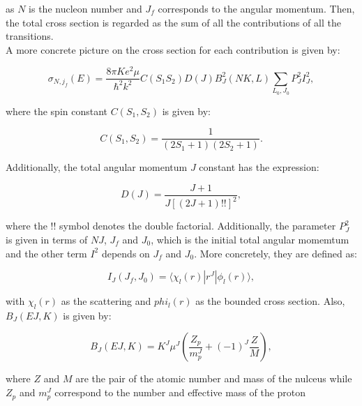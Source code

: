 \documentclass[openany]{book}
\begin{document}
as $N$ is the nucleon number and $J_f$ corresponds to the angular momentum. Then, the total cross section is regarded as the sum of all the contributions of all the transitions.\\

A more concrete picture on the cross section for each contribution is given by: 

\begin{equation}\label{eq:potential_radiativeCrossSections_each}
	 \sigma_{N, j_f} (E) = \frac{8\pi K e^2 \mu}{\hbar^2 k^2} C(S_1 S_2) D(J) B^2_J(NK, L) \sum_{L_0, J_0} P^2_{J} I^2_{J} ,
\end{equation}

where the spin constant $C(S_1, S_2)$ is given by: 

\begin{equation}\label{eq:potential_radiativeCrossSections_spinConstant}
	C(S_1, S_2) = \frac{1}{(2S_1 + 1)(2S_2 + 1)}.
\end{equation}

Additionally, the total angular momentum $J$ constant has the expression:

\begin{equation}\label{eq:potential_radiativeCrossSections_JConstant}
	D(J) = \frac{J+1}{J[(2J + 1)!!]^2},
\end{equation}

where the !! symbol denotes the double factorial. Additionally, the parameter $P^2_{J}$ is given in terms of $NJ$, $J_f$ and $J_0$, which is the initial total angular momemtum and the other term $I^2$ depends on $J_f$ and $J_0$. More concretely, they are defined as:

\begin{equation}\label{eq:potential_radiativeCrossSections_Iintegral}
	I_J(J_f, J_0) = 	\langle\chi_l(r) | r^J| \phi_l(r) \rangle,
\end{equation}

with $\chi_l(r) $ as the scattering and $phi_l(r) $ as the bounded cross section. Also, $B_J(EJ, K)$ is given by:

\begin{equation}\label{eq:potential_radiativeCrossSections_Bj}
	B_J(EJ, K) = K^J \mu^J \left( \frac{Z_p}{m^J_p} + (-1)^{J} \frac{Z}{M}\right),
\end{equation}

where $Z$ and $M$ are the pair of the atomic number and mass of the nulceus while $Z_p$ and $m^J_p$ correspond to the number and effective mass of the proton
\end{document}

